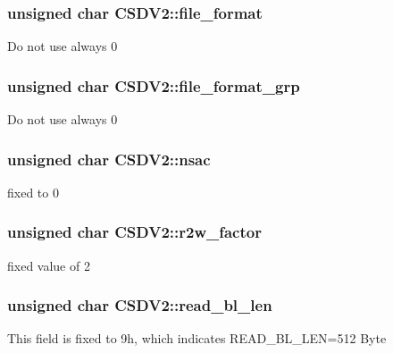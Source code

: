 \subsubsection[{\texorpdfstring{file\+\_\+format}{file_format}}]{\setlength{\rightskip}{0pt plus 5cm}unsigned char C\+S\+D\+V2\+::file\+\_\+format}\hypertarget{struct_c_s_d_v2_a9b62ba9447a21e359aef85441755500e}{}\label{struct_c_s_d_v2_a9b62ba9447a21e359aef85441755500e}
Do not use always 0 
\subsubsection[{\texorpdfstring{file\+\_\+format\+\_\+grp}{file_format_grp}}]{\setlength{\rightskip}{0pt plus 5cm}unsigned char C\+S\+D\+V2\+::file\+\_\+format\+\_\+grp}\hypertarget{struct_c_s_d_v2_af21c794c85486d738e4b8bff3a6d9317}{}\label{struct_c_s_d_v2_af21c794c85486d738e4b8bff3a6d9317}
Do not use always 0 
\subsubsection[{\texorpdfstring{nsac}{nsac}}]{\setlength{\rightskip}{0pt plus 5cm}unsigned char C\+S\+D\+V2\+::nsac}\hypertarget{struct_c_s_d_v2_aa94bece488dd8683b532069d97d8b764}{}\label{struct_c_s_d_v2_aa94bece488dd8683b532069d97d8b764}
fixed to 0 
\subsubsection[{\texorpdfstring{r2w\+\_\+factor}{r2w_factor}}]{\setlength{\rightskip}{0pt plus 5cm}unsigned char C\+S\+D\+V2\+::r2w\+\_\+factor}\hypertarget{struct_c_s_d_v2_a72c641974e9b6e4c8877454c4a378c6a}{}\label{struct_c_s_d_v2_a72c641974e9b6e4c8877454c4a378c6a}
fixed value of 2 
\subsubsection[{\texorpdfstring{read\+\_\+bl\+\_\+len}{read_bl_len}}]{\setlength{\rightskip}{0pt plus 5cm}unsigned char C\+S\+D\+V2\+::read\+\_\+bl\+\_\+len}\hypertarget{struct_c_s_d_v2_a660d402b75b24435ebc73863dabaa176}{}\label{struct_c_s_d_v2_a660d402b75b24435ebc73863dabaa176}
This field is fixed to 9h, which indicates R\+E\+A\+D\+\_\+\+B\+L\+\_\+\+L\+EN=512 Byte 
